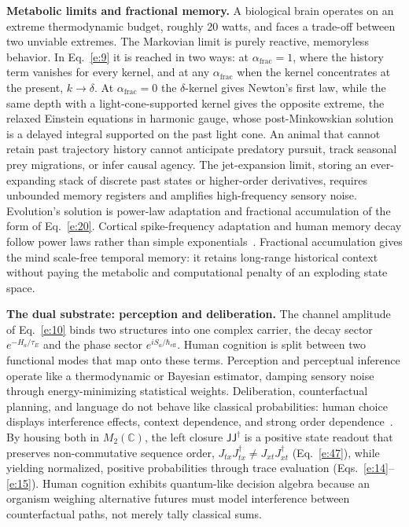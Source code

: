 \documentclass[10pt]{article}
\newcommand{\sJ}{\mathsf{J}}
\newcommand{\afrac}{\alpha_{\mathrm{frac}}}
\newcommand{\hbareff}{\hbar_{\mathrm{eff}}}
\begin{document}
\smallskip
\noindent\textbf{Metabolic limits and fractional memory.} A biological brain operates on an extreme thermodynamic budget, roughly 20 watts, and faces a trade-off between two unviable extremes. The Markovian limit is purely reactive, memoryless behavior. In Eq.~\eqref{e:9} it is reached in two ways: at $\afrac=1$, where the history term vanishes for every kernel, and at any $\afrac$ when the kernel concentrates at the present, $k\to\delta$. At $\afrac=0$ the $\delta$-kernel gives Newton's first law, while the same depth with a light-cone-supported kernel gives the opposite extreme, the relaxed Einstein equations in harmonic gauge, whose post-Minkowskian solution is a delayed integral supported on the past light cone. An animal that cannot retain past trajectory history cannot anticipate predatory pursuit, track seasonal prey migrations, or infer causal agency. The jet-expansion limit, storing an ever-expanding stack of discrete past states or higher-order derivatives, requires unbounded memory registers and amplifies high-frequency sensory noise. Evolution's solution is power-law adaptation and fractional accumulation of the form of Eq.~\eqref{e:20}. Cortical spike-frequency adaptation and human memory decay follow power laws rather than simple exponentials~\cite{lundstrom,wixted}. Fractional accumulation gives the mind scale-free temporal memory: it retains long-range historical context without paying the metabolic and computational penalty of an exploding state space.

\smallskip
\noindent\textbf{The dual substrate: perception and deliberation.} The channel amplitude of Eq.~\eqref{e:10} binds two structures into one complex carrier, the decay sector $e^{-H_a/\tau_E}$ and the phase sector $e^{iS_a/\hbareff}$. Human cognition is split between two functional modes that map onto these terms. Perception and perceptual inference operate like a thermodynamic or Bayesian estimator, damping sensory noise through energy-minimizing statistical weights. Deliberation, counterfactual planning, and language do not behave like classical probabilities: human choice displays interference effects, context dependence, and strong order dependence~\cite{wangqo,busemeyer}. By housing both in $M_2(\mathbb C)$, the left closure $\sJ\sJ^\dagger$ is a positive state readout that preserves non-commutative sequence order, $J_{tx}J_{tx}^\dagger\neq J_{xt}J_{xt}^\dagger$ (Eq.~\eqref{e:47}), while yielding normalized, positive probabilities through trace evaluation (Eqs.~\eqref{e:14}--\eqref{e:15}). Human cognition exhibits quantum-like decision algebra because an organism weighing alternative futures must model interference between counterfactual paths, not merely tally classical sums.
\end{document}
